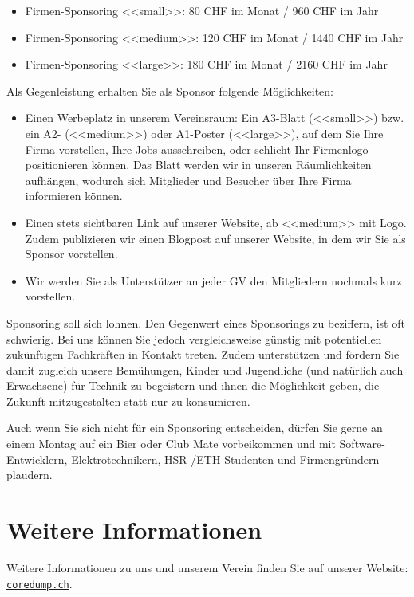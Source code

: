 \documentclass[10pt,a4paper,parskip,fleqn]{scrartcl}
\begin{document}
\begin{itemize}
	\item Firmen-Sponsoring <<small>>: 80 CHF im Monat / 960 CHF im Jahr
	\item Firmen-Sponsoring <<medium>>: 120 CHF im Monat / 1440 CHF im Jahr
	\item Firmen-Sponsoring <<large>>: 180 CHF im Monat / 2160 CHF im Jahr
\end{itemize}

Als Gegenleistung erhalten Sie als Sponsor folgende Möglichkeiten:

\begin{itemize}
	\item Einen Werbeplatz in unserem Vereinsraum: Ein A3-Blatt (<<small>>) bzw.
		ein A2- (<<medium>>) oder A1-Poster (<<large>>), auf dem Sie Ihre Firma
		vorstellen, Ihre Jobs ausschreiben, oder schlicht Ihr Firmenlogo
		positionieren können. Das Blatt werden wir in unseren Räumlichkeiten
		aufhängen, wodurch sich Mitglieder und Besucher über Ihre Firma
		informieren können.
	\item Einen stets sichtbaren Link auf unserer Website, ab <<medium>> mit Logo.
		Zudem publizieren wir einen Blogpost auf unserer Website, in dem wir Sie als
		Sponsor vorstellen.
	\item Wir werden Sie als Unterstützer an jeder GV den Mitgliedern nochmals
		kurz vorstellen.
\end{itemize}

Sponsoring soll sich lohnen. Den Gegenwert eines Sponsorings zu beziffern, ist
oft schwierig. Bei uns können Sie jedoch vergleichsweise günstig mit
potentiellen zukünftigen Fachkräften in Kontakt treten. Zudem unterstützen und
fördern Sie damit zugleich unsere Bemühungen, Kinder und Jugendliche (und
natürlich auch Erwachsene) für Technik zu begeistern und ihnen die Möglichkeit
geben, die Zukunft mitzugestalten statt nur zu konsumieren.

Auch wenn Sie sich nicht für ein Sponsoring entscheiden, dürfen Sie gerne an
einem Montag auf ein Bier oder Club Mate vorbeikommen und mit
Software-Entwicklern, Elektrotechnikern, HSR-/ETH-Studenten und Firmengründern
plaudern.

\newpage
\section{Weitere Informationen}

Weitere Informationen zu uns und unserem Verein finden Sie auf unserer Website:
\href{https://www.coredump.ch/}{\texttt{coredump.ch}}.
\end{document}
